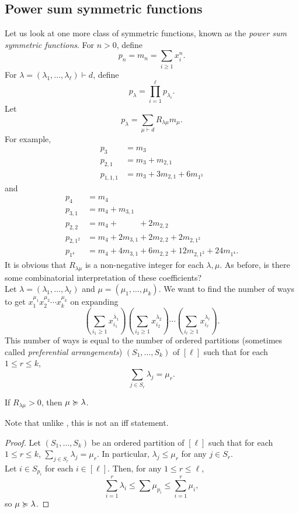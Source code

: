 
\subsection{Power sum symmetric functions}

	Let us look at one more class of symmetric functions, known as the \emph{power sum symmetric functions}. For $n > 0$, define
	\[ p_n = m_n = \sum_{i \ge 1} x_i^n. \]
	For $\lambda = (\lambda_1,\ldots,\lambda_\ell) \vdash d$, define
	\[ p_\lambda = \prod_{i=1}^\ell p_{\lambda_i}. \]
	Let
	\[ p_\lambda = \sum_{\mu \vdash d} R_{\lambda\mu} m_\mu. \]
	For example,
	\begin{align*}
		p_3 &= m_3 \\
		p_{2,1} &= m_3 + m_{2,1} \\
		p_{1,1,1} &= m_3 + 3m_{2,1} + 6m_{1^3}
	\end{align*}
	and
	\begin{align*}
		p_4 &= m_4 \\
		p_{3,1} &= m_4 + m_{3,1} \\
		p_{2,2} &= m_4 + \phantom{0m_{3,1}} + 2m_{2,2} \\
		p_{2,1^2} &= m_4 + 2m_{3,1} + 2m_{2,2} + 2m_{2,1^2} \\
		p_{1^4} &= m_4 + 4m_{3,1} + 6m_{2,2} + 12m_{2,1^2} + 24m_{1^4}.
	\end{align*}
	It is obvious that $R_{\lambda\mu}$ is a non-negative integer for each $\lambda,\mu$. As before, is there some combinatorial interpretation of these coefficients?\\
	Let $\lambda = (\lambda_1,\ldots,\lambda_\ell)$ and $\mu = (\mu_1,\ldots,\mu_k)$. We want to find the number of ways to get $x_1^{\mu_1} x_2^{\mu_2} \cdots x_k^{\mu_k}$ on expanding
	\[ \left( \sum_{i_1 \ge 1} x_{i_1}^{\lambda_1} \right) \left( \sum_{i_2 \ge 1} x_{i_2}^{\lambda_2} \right) \cdots \left( \sum_{i_\ell \ge 1} x_{i_\ell}^{\lambda_\ell} \right). \]
	This number of ways is equal to the number of ordered partitions (sometimes called \emph{preferential arrangements}) $(S_1,\ldots,S_k)$ of $[\ell]$ such that for each $1 \le r \le k$,
	\[ \sum_{j \in S_r} \lambda_j = \mu_r.  \]

	\begin{ftheo}
		If $R_{\lambda\mu} > 0$, then $\mu \succcurlyeq \lambda$.
	\end{ftheo}
	Note that unlike , this is not an iff statement.
	\begin{proof}
		Let $(S_1,\ldots,S_k)$ be an ordered partition of $[\ell]$ such that for each $1 \le r \le k$, $\sum_{j \in S_r} \lambda_j = \mu_r$. In particular, $\lambda_j \le \mu_r$ for any $j \in S_r$. \\
		Let $i \in S_{p_i}$ for each $i \in [\ell]$. Then, for any $1 \le r \le \ell$,
		\[ \sum_{i=1}^r \lambda_{i} \le \sum \mu_{p_i} \le \sum_{i=1}^r \mu_{i}, \]
		so $\mu \succcurlyeq \lambda$.
	\end{proof}

